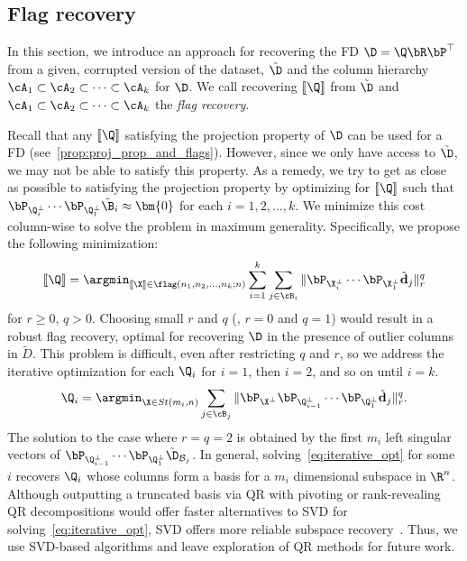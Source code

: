 \subsection{Flag recovery}
In this section, we introduce an approach for recovering the FD $\D = \Q \bR \bP^\top$ from a given, corrupted version of the dataset, $\tilde{\D}$ and the column hierarchy $\cA_1 \subset \cA_2 \subset \cdots \subset \cA_k$ for $\D$. We call recovering $[\![ \Q ]\!]$ from $\tilde{\D}$ and $\cA_1 \subset \cA_2 \subset \cdots \subset \cA_k$ the \emph{flag recovery}.


Recall that any $[\![ \Q ]\!]$ satisfying the projection property of $\D$ can be used for a FD (see~\cref{prop:proj_prop_and_flags}). However, since we only have access to $\tilde{\D}$, we may not be able to satisfy this property. As a remedy, we try to get as close as possible to satisfying the projection property by optimizing for $[\![\Q]\!]$ such that $\bP_{\Q_i^\perp} \cdots \bP_{\Q_1^\perp}\tilde{\B}_i \approx \bm{0}$ for each $i=1,2,\dots,k$. We minimize this cost column-wise to solve the problem in maximum generality. Specifically, we propose the following minimization:
\begin{equation}\label{eq:general_opt}
    [\![\Q]\!] = \argmin_{[\![\X]\!] \in \flag(n_1,n_2, \dots, n_k;n)} \sum_{i=1}^k \sum_{j \in \cB_i}\| \bP_{\X_i^\perp} \cdots \bP_{\X_1^\perp} \tilde{\mathbf{d}}_j \|_r^q
\end{equation}
for $r\geq 0$, $q > 0$. Choosing small $r$ and $q$ (\eg, $r =0$ and $q=1$) would result in a robust flag recovery, optimal for recovering $\D$ in the presence of outlier columns in $\tilde{D}$. This problem is difficult, even after restricting $q$ and $r$, so we address the iterative optimization for each $\Q_i$ for $i=1$, then $i=2$, and so on until $i=k$.
\begin{equation}\label{eq:iterative_opt}
    \Q_i =  \argmin_{\X \in St(m_i,n)} \sum_{j \in \cB_j}\| \bP_{\X^\perp} \bP_{\Q^\perp_{i-1}} \cdots \bP_{\Q^\perp_1} \tilde{\mathbf{d}}_j \|_r^q.
\end{equation}
The solution to the case where $r=q=2$ is obtained by the first $m_i$ left singular vectors of $\bP_{\Q^\perp_{i-1}} \cdots \bP_{\Q^\perp_1} \tilde{\D}_{\mathcal{B}_j}$.
In general, solving~\cref{eq:iterative_opt} for some $i$ recovers $\Q_i$ whose columns form a basis for a $m_i$ dimensional subspace in $\R^n$.
Although outputting a truncated basis via QR with pivoting or rank-revealing QR decompositions would offer faster alternatives to SVD for solving~\cref{eq:iterative_opt}, SVD offers more reliable subspace recovery~\cite{demmel1997applied}. Thus, we use SVD-based algorithms and leave exploration of QR methods for future work.

